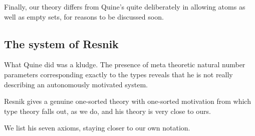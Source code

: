 \documentclass[12pt]{article}
\begin{document}
Finally, our theory differs from Quine's quite deliberately in allowing atoms as well as empty sets, for reasons to be discussed soon.




\subsection{The system of Resnik}

What Quine did was a kludge.  The presence of meta theoretic natural number parameters corresponding exactly to the types
reveals that he is not really describing an autonomously motivated system.

Resnik gives a genuine one-sorted theory with one-sorted motivation from which type theory falls out, as we do, and his theory is very close to ours.

We list his seven axioms, staying closer to our own notation.
\end{document}
